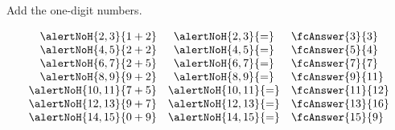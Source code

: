 \begin{frame}
\begin{example}
Add the one-digit numbers. 

\[
\begin{array}{rcl}
\alertNoH{2 ,3 }{1 + 2} &\alertNoH{2 ,3 }{=}&\fcAnswer{3 }{3 }\\
\alertNoH{4 ,5 }{2 + 2} &\alertNoH{4 ,5 }{=}&\fcAnswer{5 }{4 }\\
\alertNoH{6 ,7 }{2 + 5} &\alertNoH{6 ,7 }{=}&\fcAnswer{7 }{7 }\\
\alertNoH{8 ,9 }{9 + 2} &\alertNoH{8 ,9 }{=}&\fcAnswer{9 }{11}\\
\alertNoH{10,11}{7 + 5} &\alertNoH{10,11}{=}&\fcAnswer{11}{12}\\
\alertNoH{12,13}{9 + 7} &\alertNoH{12,13}{=}&\fcAnswer{13}{16}\\
\alertNoH{14,15}{0 + 9} &\alertNoH{14,15}{=}&\fcAnswer{15}{9}\\
\end{array}
\]
\end{example}
\end{frame}